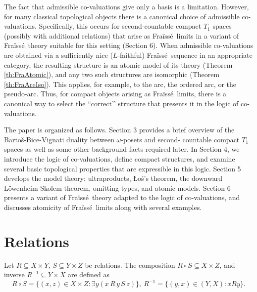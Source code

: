\documentclass[12pt]{amsart}
\theoremstyle{plain}
\newtheorem{remark}[theorem]{\bf Remark}
\newcommand \fra{Fra\"{i}ss\'{e}}
\begin{document}
The fact that admissible co-valuations give only a basis is a limitation. However, for many classical topological objects there is a canonical choice of admissible co-valuations. Specifically, this occurs for second-countable compact $T_1$ spaces (possibly with additional relations) that arise as \fra \ limits in a variant of \fra \ theory suitable for this setting (Section 6). When admissible co-valuations are obtained via a sufficiently nice ($L$-faithful)  \fra \  sequence in an appropriate category, the resulting structure is an atomic model of its theory (Theorem \ref{th:FraAtomic}), and any two such structures are isomorphic (Theorem \ref{th:FraAreIso}). This applies, for example, to the arc, the ordered arc, or the pseudo-arc. Thus, for compact objects arising as \fra \ limits, there is a canonical way to select the “correct’’ structure that presents it in the logic of co-valuations.


The paper is organized as follows. Section 3 provides a brief overview of the Barto\v s-Bice-Vignati duality between $\omega$-posets and second- countable compact $T_1$ spaces as well as some other background facts required later. In Section 4, we introduce the logic of co-valuations, define compact structures, and examine several basic topological properties that are expressible in this logic. Section 5 develops the model theory: ultraproducts, Łoś's theorem, the downward L\"owenheim-Skolem theorem, omitting types, and atomic models. Section 6 presents a variant of \fra \ theory adapted to the logic of co-valuations, and discusses atomicity of \fra \ limits along with several examples.

\section{Relations}	
Let $R \subseteq X \times Y$, $S \subseteq Y \times Z$ be relations. The composition $R \circ S \subseteq X \times Z$, and inverse $R^{-1} \subseteq Y \times X$ are defined as $$R \circ S =\{ (x,z) \in X \times Z: \exists y (x \, R \, y \, S \, z)\}, \ R^{-1}=\{(y,x) \in (Y,X): xRy\}.$$ 
%
\end{document}
